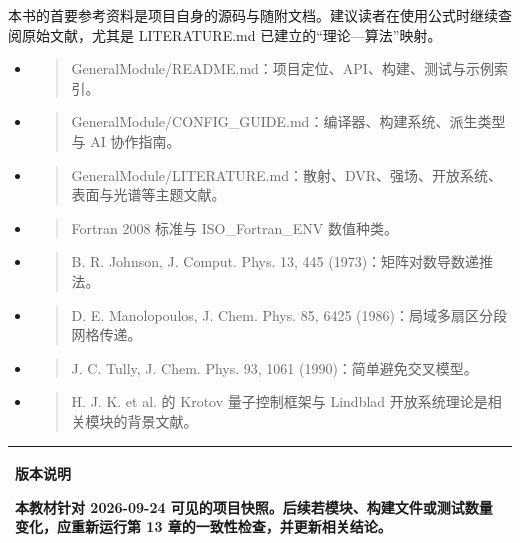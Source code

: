 \documentclass[UTF8,openany,11pt,fontset=fandol]{ctexbook}
\begin{document}
本书的首要参考资料是项目自身的源码与随附文档。建议读者在使用公式时继续查阅原始文献，尤其是
LITERATURE.md 已建立的``理论---算法''映射。

\begin{itemize}
\item
  \begin{quote}
  GeneralModule/README.md：项目定位、API、构建、测试与示例索引。
  \end{quote}
\item
  \begin{quote}
  GeneralModule/CONFIG\_GUIDE.md：编译器、构建系统、派生类型与 AI
  协作指南。
  \end{quote}
\item
  \begin{quote}
  GeneralModule/LITERATURE.md：散射、DVR、强场、开放系统、表面与光谱等主题文献。
  \end{quote}
\item
  \begin{quote}
  Fortran 2008 标准与 ISO\_Fortran\_ENV 数值种类。
  \end{quote}
\item
  \begin{quote}
  B. R. Johnson, J. Comput. Phys. 13, 445 (1973)：矩阵对数导数递推法。
  \end{quote}
\item
  \begin{quote}
  D. E. Manolopoulos, J. Chem. Phys. 85, 6425
  (1986)：局域多扇区分段网格传递。
  \end{quote}
\item
  \begin{quote}
  J. C. Tully, J. Chem. Phys. 93, 1061 (1990)：简单避免交叉模型。
  \end{quote}
\item
  \begin{quote}
  H. J. K. et al. 的 Krotov 量子控制框架与 Lindblad
  开放系统理论是相关模块的背景文献。
  \end{quote}
\end{itemize}

\begin{longtable}[]{@{}l@{}}
\toprule
\endhead
\begin{minipage}[t]{0.97\columnwidth}\raggedright
\textbf{版本说明}

本教材针对 2026-09-24
可见的项目快照。后续若模块、构建文件或测试数量变化，应重新运行第 13
章的一致性检查，并更新相关结论。\strut
\end{minipage}\tabularnewline
\bottomrule
\end{longtable}
\end{document}

